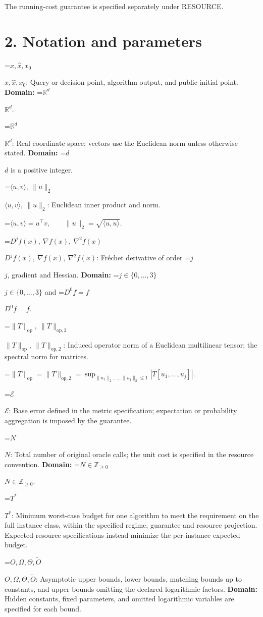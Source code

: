 \documentclass[10pt,a4paper]{article}
\newcommand{\AtlasMath}[1]{\par\begingroup\centering\setbox0=\hbox{$\displaystyle #1$}\ifdim\wd0>1.4\linewidth\typeout{ATLAS WIDE FORMULA: \the\wd0}\fi\ifdim\wd0>\linewidth\resizebox{\linewidth}{!}{\box0}\else\box0\fi\par\endgroup}
\newcommand{\AtlasInlineMath}[1]{\begingroup\setbox0=\hbox{$#1$}\ifdim\wd0>.4\linewidth\endgroup\AtlasMath{#1}\else\endgroup$#1$\fi}
\begin{document}
The running-cost guarantee is specified separately under RESOURCE.

\section{2. Notation and parameters}
\AtlasInlineMath{x,\widehat{x},x_0}: Query or decision point, algorithm output, and public initial point. \textbf{Domain:} \AtlasInlineMath{\mathbb{R}^d}.

\AtlasInlineMath{\mathbb{R}^d}: Real coordinate space; vectors use the Euclidean norm unless otherwise stated. \textbf{Domain:} \AtlasInlineMath{d} is a positive integer.

\AtlasInlineMath{\langle u,v\rangle,\ \|u\|_2}: Euclidean inner product and norm.


\AtlasMath{\langle u,v\rangle=u^\top v,\qquad\|u\|_2=\sqrt{\langle u,u\rangle}.}


\AtlasInlineMath{D^jf(x),\ \nabla f(x),\ \nabla^2f(x)}: Fréchet derivative of order \AtlasInlineMath{j}, gradient and Hessian. \textbf{Domain:} \AtlasInlineMath{j\in\{0,\ldots,3\}} and \AtlasInlineMath{D^0f=f}.

\AtlasInlineMath{\|T\|_{\mathrm{op}},\ \|T\|_{\mathrm{op},2}}: Induced operator norm of a Euclidean multilinear tensor; the spectral norm for matrices.


\AtlasMath{\|T\|_{\mathrm{op}}=\|T\|_{\mathrm{op},2}=\sup_{\|u_1\|_2,\ldots,\|u_j\|_2\le1}|T[u_1,\ldots,u_j]|.}


\AtlasInlineMath{\mathcal{E}}: Base error defined in the metric specification; expectation or probability aggregation is imposed by the guarantee.

\AtlasInlineMath{N}: Total number of original oracle calls; the unit cost is specified in the resource convention. \textbf{Domain:} \AtlasInlineMath{N\in\mathbb{Z}_{\ge0}}.

\AtlasInlineMath{T^*}: Minimum worst-case budget for one algorithm to meet the requirement on the full instance class, within the specified regime, guarantee and resource projection. Expected-resource specifications instead minimize the per-instance expected budget.

\AtlasInlineMath{O,\Omega,\Theta,\widetilde{O}}: Asymptotic upper bounds, lower bounds, matching bounds up to constants, and upper bounds omitting the declared logarithmic factors. \textbf{Domain:} Hidden constants, fixed parameters, and omitted logarithmic variables are specified for each bound.
\end{document}

